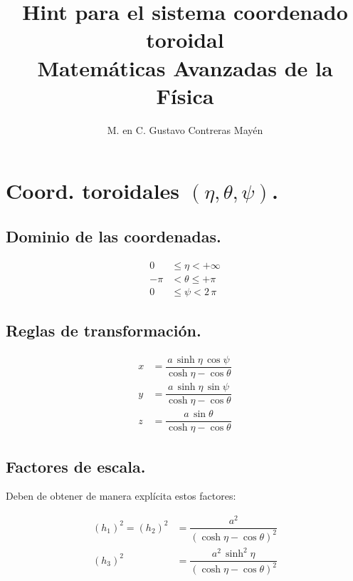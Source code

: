 
\usepackage{apacite}
\title{Hint para el sistema coordenado toroidal \\[0.3em]  \large{Matemáticas Avanzadas de la Física}\vspace{-3ex}}
\author{M. en C. Gustavo Contreras Mayén}
\date{ }

\vspace{-4cm}
\maketitle
\fontsize{14}{14}\selectfont

\section{Coord. toroidales \texorpdfstring{$(\eta, \theta, \psi)$}{(e, t, p)}.}

\subsection{Dominio de las coordenadas.}

\begin{align*}
0 &\leq \eta < +\infty \\
-\pi &< \theta \leq +\pi \\
0 &\leq \psi < 2 \, \pi
\end{align*}

\subsection{Reglas de transformación.}

\begin{align*}
x &= \dfrac{a \, \sinh \eta \, \cos \psi}{\cosh \eta - \cos \theta} \\[0.5em]
y &= \dfrac{a \, \sinh \eta \, \sin \psi}{\cosh \eta - \cos \theta} \\[0.5em]
z &= \dfrac{a \, \sin \theta}{\cosh \eta - \cos \theta}
\end{align*}

\subsection{Factores de escala.}

Deben de obtener de manera explícita estos factores:

\begin{align*}
(h_{1})^{2} = (h_{2})^{2} &= \dfrac{a^{2}}{(\cosh \eta - \cos \theta)^{2}} \\[0.5em]
(h_{3})^{2} &= \dfrac{a^{2} \, \sinh^{2} \eta}{(\cosh \eta - \cos \theta)^{2}}
\end{align*}

